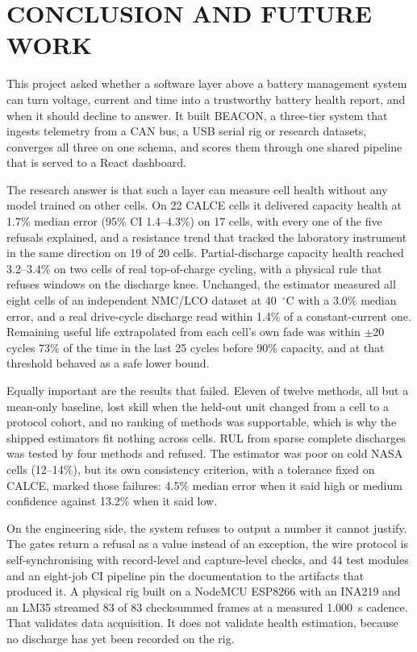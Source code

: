 \documentclass[12pt,a4paper]{amritareport}
\begin{document}
\chapter{CONCLUSION AND FUTURE WORK}
\label{ch:conclusion}

This project asked whether a software layer above a battery management system can turn voltage, current and time into a trustworthy battery health report, and when it should decline to answer. It built BEACON, a three-tier system that ingests telemetry from a CAN bus, a USB serial rig or research datasets, converges all three on one schema, and scores them through one shared pipeline that is served to a React dashboard.

The research answer is that such a layer can measure cell health without any model trained on other cells. On 22 CALCE cells it delivered capacity health at 1.7\% median error (95\% CI 1.4--4.3\%) on 17 cells, with every one of the five refusals explained, and a resistance trend that tracked the laboratory instrument in the same direction on 19 of 20 cells. Partial-discharge capacity health reached 3.2--3.4\% on two cells of real top-of-charge cycling, with a physical rule that refuses windows on the discharge knee. Unchanged, the estimator measured all eight cells of an independent NMC/LCO dataset at 40~$^\circ$C with a 3.0\% median error, and a real drive-cycle discharge read within 1.4\% of a constant-current one. Remaining useful life extrapolated from each cell's own fade was within $\pm$20 cycles 73\% of the time in the last 25 cycles before 90\% capacity, and at that threshold behaved as a safe lower bound.

Equally important are the results that failed. Eleven of twelve methods, all but a mean-only baseline, lost skill when the held-out unit changed from a cell to a protocol cohort, and no ranking of methods was supportable, which is why the shipped estimators fit nothing across cells. RUL from sparse complete discharges was tested by four methods and refused. The estimator was poor on cold NASA cells (12--14\%), but its own consistency criterion, with a tolerance fixed on CALCE, marked those failures: 4.5\% median error when it said high or medium confidence against 13.2\% when it said low.

On the engineering side, the system refuses to output a number it cannot justify. The gates return a refusal as a value instead of an exception, the wire protocol is self-synchronising with record-level and capture-level checks, and 44 test modules and an eight-job CI pipeline pin the documentation to the artifacts that produced it. A physical rig built on a NodeMCU ESP8266 with an INA219 and an LM35 streamed 83 of 83 checksummed frames at a measured 1.000~s cadence. That validates data acquisition. It does not validate health estimation, because no discharge has yet been recorded on the rig.
\end{document}
